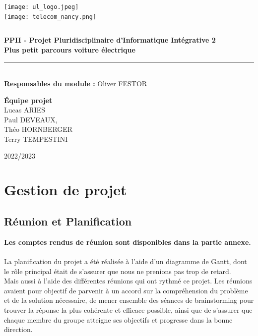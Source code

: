 \documentclass[12pt,titlepage]{report}
\begin{document}
\begin{titlepage}
\newcommand{\HRule}{\rule{\linewidth}{0.5mm}}
\center
\texttt{[image: ul\_logo.jpeg]} \\[0.6cm]
\texttt{[image: telecom\_nancy.png]} \\[0.2cm]
\HRule
{ \huge \bfseries PPII - Projet Pluridisciplinaire d'Informatique Intégrative 2 \\
        \Large Plus petit parcours voiture électrique\\[0.15cm] }
\HRule \\[1cm]
{\LARGE \textbf{Responsables du module :}}
\vskip 0.1cm
{\Large 
Oliver FESTOR \\ 
} 


\vspace{1cm}
{\LARGE \textbf{Équipe projet}} \\ 
\vspace{0.1cm}
\Large Lucas ARIES \\
Paul DEVEAUX, \\ 
Théo HORNBERGER \\
Terry TEMPESTINI\\
\vspace{3cm}
    
2022/2023 \\ [1cm]
\end{titlepage}

\tableofcontents
\clearpage
\chapter{Gestion de projet}

\section{Réunion et Planification}
\textbf{Les comptes rendus de réunion sont disponibles dans la partie annexe.} \\ \\ 

La planification du projet a été réalisée à l'aide d'un diagramme de Gantt, dont le rôle principal était de s'assurer que nous ne prenions pas trop de retard. \\
Mais aussi à l'aide des différentes réunions qui ont rythmé ce projet. Les réunions avaient pour objectif de parvenir à un accord sur la compréhension du problème et de la solution nécessaire, de mener ensemble des séances de brainstorming pour trouver la réponse la plus cohérente et efficace possible, ainsi que de s'assurer que chaque membre du groupe atteigne ses objectifs et progresse dans la bonne direction.
\end{document}
